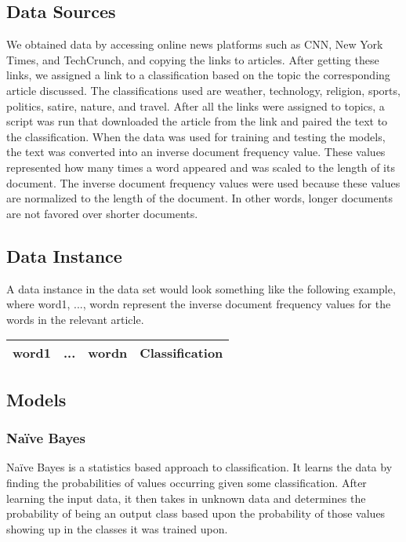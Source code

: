 \documentclass[fleqn,11pt]{article}
\begin{document}
\begin{multicols}{2}
        \subsection{Data Sources}
        We obtained data by accessing online news platforms such as CNN, New York Times, and 
        TechCrunch, and copying the links to articles. After getting these links, we assigned a 
        link to a classification based on the topic the corresponding article discussed. The 
        classifications used are weather, technology, religion, sports, politics, satire, 
        nature, and travel. After all the links were assigned to topics, a script was run that 
        downloaded the article from the link and paired the text to the classification. When the 
        data was used for training and testing the models, the text was converted into an inverse 
        document frequency value. These values represented how many times a word appeared and was 
        scaled to the length of its document. The inverse document frequency values were used 
        because these values are normalized to the length of the document. In other words, longer 
        documents are not favored over shorter documents.

        \subsection{Data Instance}
        A data instance in the data set would look something like the following example, where 
        word1, ..., wordn represent the inverse document frequency values for the words in the 
        relevant article.
        \begin{center}
            \begin{tabular}{|c|c|c|c|}
                \hline
                word1 & ... & wordn & Classification\\
                \hline
            \end{tabular}
        \end{center}
    
        \subsection{Models}
            \subsubsection{Na\"ive Bayes}
            Na\"ive Bayes is a statistics based approach to classification. It learns the data by 
            finding the probabilities of values occurring given some classification. After 
            learning the input data, it then takes in unknown data and determines the probability 
            of being an output class based upon the probability of those values showing up in the 
            classes it was trained upon.

\end{multicols}
\end{document}
